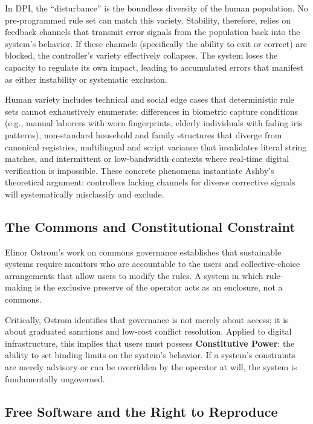 \documentclass{article}
\begin{document}
In DPI, the ``disturbance'' is the boundless diversity of the human population. No pre-programmed rule set can match this variety. Stability, therefore, relies on feedback channels that transmit error signals from the population back into the system's behavior. If these channels (specifically the ability to exit or correct) are blocked, the controller's variety effectively collapses. The system loses the capacity to regulate its own impact, leading to accumulated errors that manifest as either instability or systematic exclusion.

Human variety includes technical and social edge cases that deterministic rule sets cannot exhaustively enumerate: differences in biometric capture conditions (e.g., manual laborers with worn fingerprints, elderly individuals with fading iris patterns), non-standard household and family structures that diverge from canonical registries, multilingual and script variance that invalidates literal string matches, and intermittent or low-bandwidth contexts where real-time digital verification is impossible. These concrete phenomena instantiate Ashby's theoretical argument: controllers lacking channels for diverse corrective signals will systematically misclassify and exclude.

\subsection{The Commons and Constitutional Constraint}

Elinor Ostrom's work on commons governance \citep{ostrom1990} establishes that sustainable systems require monitors who are accountable to the users and collective-choice arrangements that allow users to modify the rules. A system in which rule-making is the exclusive preserve of the operator acts as an enclosure, not a commons.

Critically, Ostrom identifies that governance is not merely about access; it is about graduated sanctions and low-cost conflict resolution. Applied to digital infrastructure, this implies that users must possess \textbf{Constitutive Power}: the ability to set binding limits on the system's behavior. If a system's constraints are merely advisory or can be overridden by the operator at will, the system is fundamentally ungoverned.

\subsection{Free Software and the Right to Reproduce}
\end{document}
